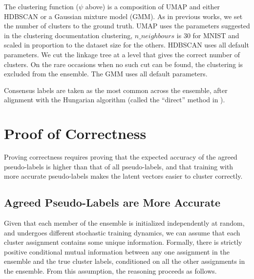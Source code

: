 \documentclass[runningheads]{llncs}
\begin{document}
The clustering function ($\psi$ above) is a composition of UMAP \cite{mcinnes2018umap} and either HDBSCAN \cite{mcinnes2017hdbscan} or a Gaussian mixture model (GMM). As in previous works, we set the number of clusters to the ground truth. UMAP uses the parameters suggested in the clustering documentation clustering, $n\_neighbours$ is $30$ for MNIST and scaled in proportion to the dataset size for the others. HDBSCAN uses all default parameters. We cut the linkage tree at a level that gives the correct number of clusters. On the rare occasions when no such cut can be found, the clustering is excluded from the ensemble. The GMM uses all default parameters.

Consensus labels are taken as the most common across the ensemble, after alignment with the Hungarian algorithm (called the ``direct'' method in \cite{boongoen2018cluster}). \section{Proof of Correctness} \label{sec:proof}
Proving correctness requires proving that the expected accuracy of the agreed pseudo-labels is higher than that of all pseudo-labels, and that training with more accurate pseudo-labels makes the latent vectors easier to cluster correctly.

\subsection{Agreed Pseudo-Labels are More Accurate}
Given that each member of the ensemble is initialized independently at random, and undergoes different stochastic training dynamics, we can assume that each cluster assignment contains some unique information. Formally, there is strictly positive conditional mutual information between any one assignment in the ensemble and the true cluster labels, conditioned on all the other assignments in the ensemble. From this assumption, the reasoning proceeds as follows.
\end{document}
